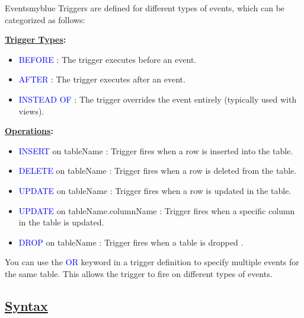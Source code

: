 \begin{prettyBox}{Events}{myblue}
Triggers are defined for different types of events, which can be categorized as follows:

\vspace{0.2cm}
\textbf{\underline{Trigger Types}:}
\begin{itemize}
    \item \textcolor{blue}{BEFORE} : The trigger executes before an event.
    \item \textcolor{blue}{AFTER} : The trigger executes after an event.
    \item \textcolor{blue}{INSTEAD OF} : The trigger overrides the event entirely (typically used with views).
\end{itemize}

\textbf{\underline{Operations}:}
\begin{itemize}
    \item \textcolor{blue}{INSERT} on tableName : Trigger fires when a row is inserted into the table.
    \item \textcolor{blue}{DELETE} on tableName : Trigger fires when a row is deleted from the table.
    \item \textcolor{blue}{UPDATE} on tableName : Trigger fires when a row is updated in the table.
    \item \textcolor{blue}{UPDATE} on tableName.columnName : Trigger fires when a specific column in the table is updated.
    \item \textcolor{blue}{DROP} on tableName : Trigger fires when a table is dropped .
\end{itemize}

You can use the \textcolor{blue}{OR} keyword in a trigger definition to specify multiple events for the same table. This allows the trigger to fire on different types of events.
\end{prettyBox}

\subsection*{\underline{Syntax}}







